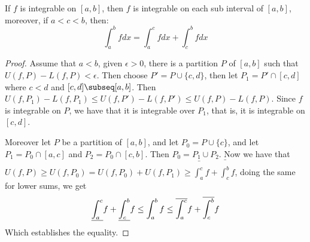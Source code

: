 \begin{theorem}\label{5.2.3}
    If $f$ is integrable on  $[a,b]$, then  $f$ is integrable on each sub
    interval of  $[a,b]$, moreover, if  $a<c<b$, then:
        \begin{equation}
            \int_{a}^{b}{f dx}=\int_{a}^{c}{f dx}+\int_{c}^{b}{f dx}
        \end{equation}
\end{theorem}
\begin{proof}
    Assume that $a<b$, given  $\epsilon>0$, there is a partition  $P$ of
    $[a,b]$ such that  $U(f,P)-L(f,P)<\epsilon$. Then choose  $P'=P \cup
    \{c,d\}$, then let  $P_1=P' \cap [c,d]$ where $c<d$ and  $[c,d] \subseq
    [a,b]$. Then $U(f,P_1)-L(f,P_1) \leq U(f,P')-L(f,P') \leq U(f,P)-L(f,P)$.
    Since $f$ is integrable on  $P$, we have that it is integrable over  $ P_1$,
    that is, it is integrable on $[c,d]$.

    Moreover let  $P$ be a partition of  $[a,b]$, and let  $ P_0=P \cup \{c\}$,
    and let $ P_1=P_0 \cap [a,c]$ and $ P_2=P_0 \cap [c,b]$. Then $ P_0=P_1 \cup
    P_2$. Now we have that $U(f,P) \geq
    U(f,P_0)=U(f,P_0)+U(f,P_1) \geq
    \bar{\int_{a}^{c}}{f}+\bar{\int_{c}^{b}}{f}$, doing the same for lower
    sums, we get
        \begin{equation*}
            \underline{\int_{a}^{c}}{f}+\underline{\int_{c}^{b}}{f} \leq
            \int_{a}^{b}{f} \leq
            \overline{\int_{a}^{c}}{f}+\overline{\int_{c}^{b}}{f}
        \end{equation*}
    Which establishes the equality.
\end{proof}
